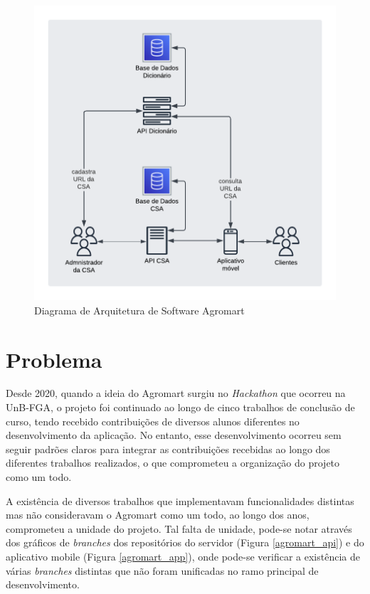 \begin{figure}[h]
	\centering
	\includegraphics[keepaspectratio=true,scale=0.8]{figuras/diagrama_arquitetura.png}
	\caption{Diagrama de Arquitetura de Software Agromart}
	\label{diagrama_arquitetura}
\end{figure}

\section{Problema}
Desde 2020, quando a ideia do Agromart surgiu no \textit{Hackathon} que ocorreu na UnB-FGA, o projeto foi continuado ao longo de cinco trabalhos de conclusão de curso, tendo recebido contribuições de diversos alunos diferentes no desenvolvimento da aplicação. No entanto, esse desenvolvimento ocorreu sem seguir padrões claros para integrar as contribuições recebidas ao longo dos diferentes trabalhos realizados, o que comprometeu a organização do projeto como um todo.

A existência de diversos trabalhos que implementavam funcionalidades distintas mas não consideravam o Agromart como um todo, ao longo dos anos, comprometeu a unidade do projeto. Tal falta de unidade, pode-se notar através dos gráficos de \textit{branches} dos repositórios do servidor (Figura \ref{agromart_api}) e do aplicativo mobile (Figura \ref{agromart_app}), onde pode-se verificar a existência de várias \textit{branches} distintas que não foram unificadas no ramo principal de desenvolvimento. 


